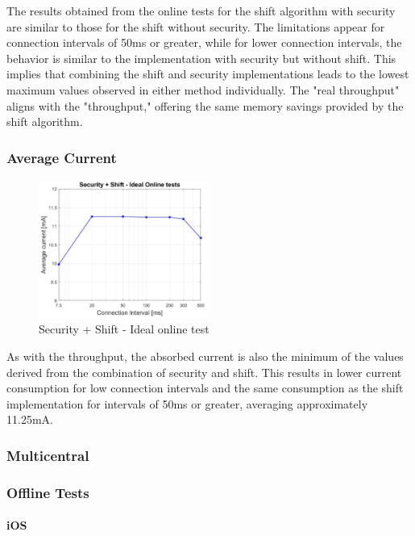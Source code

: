\documentclass{Configuration_Files/PoliMi3i_thesis}
\begin{document}
The results obtained from the online tests for the shift algorithm with security are similar to those for the shift without security. The limitations appear for connection intervals of 50ms or greater, while for lower connection intervals, the behavior is similar to the implementation with security but without shift. This implies that combining the shift and security implementations leads to the lowest maximum values observed in either method individually. The "real throughput" aligns with the "throughput," offering the same memory savings provided by the shift algorithm.

\subsubsection*{Average Current}

\begin{figure}[H]
    \centering
    \includegraphics[width=0.5\textwidth]{Results Manuel/figure24}
    \caption{Security + Shift - Ideal online test}
    \label{fmanuel_results_24}
\end{figure}

As with the throughput, the absorbed current is also the minimum of the values derived from the combination of security and shift. This results in lower current consumption for low connection intervals and the same consumption as the shift implementation for intervals of 50ms or greater, averaging approximately 11.25mA.

\subsubsection*{Multicentral}
\subsubsection*{Offline Tests}
\paragraph{iOS}
\end{document}

